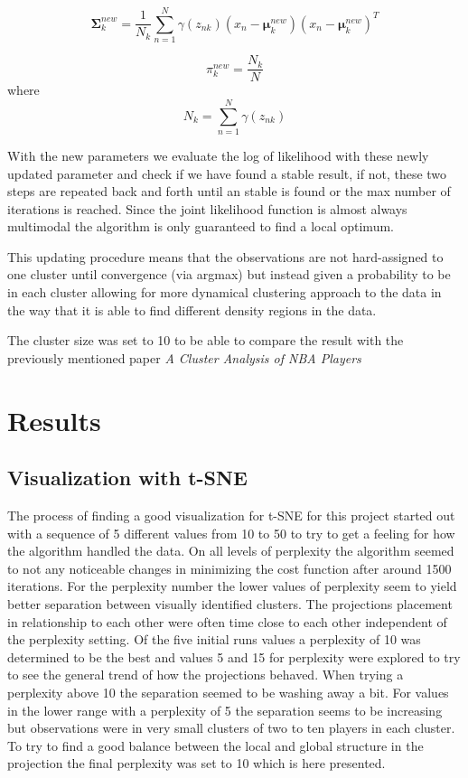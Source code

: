 \documentclass{article}
\begin{document}
$$\mathbf{\Sigma}_k^{new} = \frac{1}{N_k} \sum_{n=1}^N\gamma(z_{nk})(x_n-\mathbf{\mu}_k^{new})(x_n-\mathbf{\mu}_k^{new})^T$$

$$ \pi_k^{new}= \frac{N_k}{N} $$ 
where
$$  N_k = \sum_{n=1}^N \gamma(z_{nk})$$

With the new parameters we evaluate the log of likelihood with these newly updated parameter and check if we have found a stable result, if not, these two steps are repeated back and forth until an stable is found or the max number of iterations is reached. Since the joint likelihood function is almost always multimodal the algorithm is only guaranteed to find a local optimum.

This updating procedure means that the observations are not hard-assigned to one cluster until convergence (via argmax) but instead given a probability to be in each cluster allowing for more dynamical clustering approach to the data in the way that it is able to find different density regions in the data. \cite{Bishop:2006:PRM:1162264}

The cluster size was set to 10 to be able to compare the result with the previously mentioned paper \textit{A Cluster Analysis of NBA Players} \cite{lutz2012cluster}





\newpage

\section{Results}

\subsection{Visualization with t-SNE}

The process of finding a good visualization for t-SNE for this project started out with a sequence of 5 different values from 10 to 50 to try to get a feeling for how the algorithm handled the data. On all levels of perplexity the algorithm seemed to not any noticeable changes in minimizing the cost function after around 1500 iterations. For the perplexity number the lower values of perplexity seem to yield better separation between visually identified clusters. The projections placement in relationship to each other were often time close to each other independent of the perplexity setting. Of the five initial runs values a perplexity of 10 was determined to be the best and values 5 and 15 for perplexity were explored to try to see the general trend of how the projections behaved. When trying a perplexity above 10 the separation seemed to be washing away a bit. For values in the lower range with a perplexity of 5 the separation seems to be increasing but observations were in very small clusters of two to ten players in each cluster. To try to find a good balance between the local and global structure in the projection the final perplexity was set to 10 which is here presented.
\end{document}
